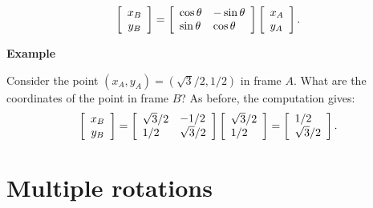 \documentclass[11pt,a4paper]{report}
\begin{document}
\begin{equation}
\left[ 
\begin{array}{c} x_B\\ y_B \end{array}
\right] = 
\left[\begin{array}{l} \cos\theta \\ \sin\theta \end{array}\\
\begin{array}{l} -\sin\theta \\ \cos\theta \end{array}\\
\right]
\left[\begin{array}{l} x_A \\ y_A \end{array}\\
\right].
\end{equation}


\textbf{Example}

Consider the point $(x_A,y_A) = (\sqrt{3}/2,1/2)$ in frame $A$. What are the coordinates of the point in frame $B$? As before, the computation gives:
\begin{displaymath}
\left[ 
\begin{array}{c} x_B\\ y_B \end{array}
\right] = 
\left[\begin{array}{l} \sqrt{3}/2 \\ 1/2 \end{array}\\
\begin{array}{l} -1/2 \\ \sqrt{3}/2 \end{array}\\
\right]
\left[\begin{array}{l} \sqrt{3}/2 \\ 1/2 \end{array}\\ \right] =
\left[\begin{array}{l} 1/2 \\ \sqrt{3}/2 \end{array}\\ \right].
\end{displaymath}


\section{Multiple rotations}
\end{document}
